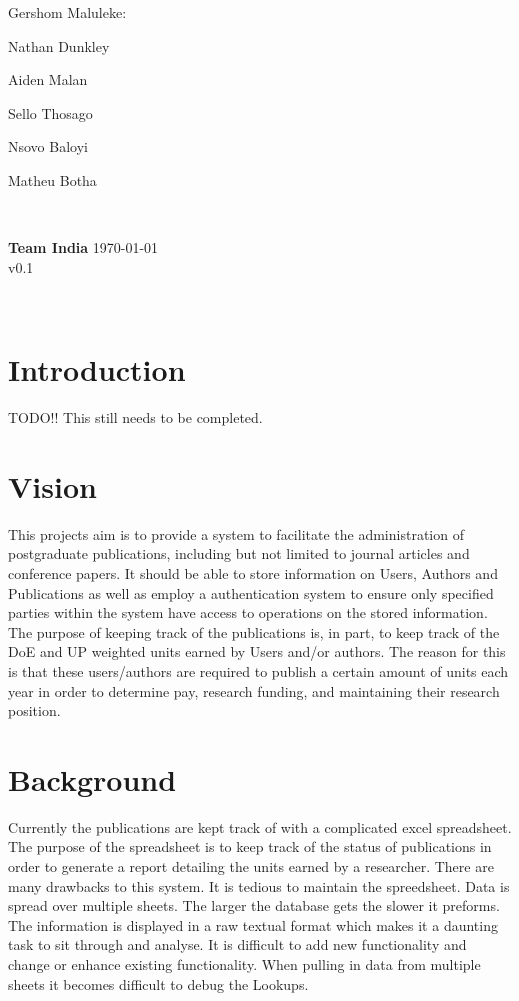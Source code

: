 \documentclass{article}
\newcommand{\tab}[1]{\hspace{.1\textwidth}\rlap{#1}}
\begin{document}
\begin{titlepage}
\begin{minipage}{0.5\textwidth}
\begin{flushleft}
	Gershom Maluleke:\tab{13229908}


	Nathan Dunkley

	Aiden Malan

	Sello Thosago

	Nsovo Baloyi

	Matheu Botha 
	\end{flushleft}
	\end{minipage}
	~
	\begin{minipage}{0.4\textwidth}
	\begin{flushright} \large
	{ \huge \bfseries Team India }%
	{\large \today}\\
	{\large v0.1}
	\end{flushright}
	\end{minipage}\\[4cm]
\end{titlepage}


	\newpage
	
	\section{Introduction}
	
	TODO!! This still needs to be completed.

	\section{Vision}

	This projects aim is to provide a system to facilitate the administration of postgraduate publications, including but not limited to journal articles and conference papers. It should be able to store information on Users, Authors and Publications as well as employ a authentication system to ensure only specified parties within the system have access to operations on the stored information.
	The purpose of keeping track of the publications is, in part, to keep track of the DoE and UP weighted units earned by Users and/or authors. The reason for this is that these users/authors are required to publish a certain amount of units each year in order to determine pay, research funding, and maintaining their research position.

	\section{Background}
	Currently the publications are kept track of with a complicated excel spreadsheet. The purpose of the spreadsheet is to keep track of the status of publications in order to generate a report detailing the units earned by a researcher. There are many drawbacks to this system. It is tedious to maintain the spreedsheet. Data is spread over multiple sheets. The larger the database gets the slower it preforms. The information is displayed in a raw textual format which makes it a daunting task to sit through and analyse. It is difficult to add new functionality and change or enhance existing functionality. When pulling in data from multiple sheets it becomes difficult to debug the Lookups.
\end{document}
